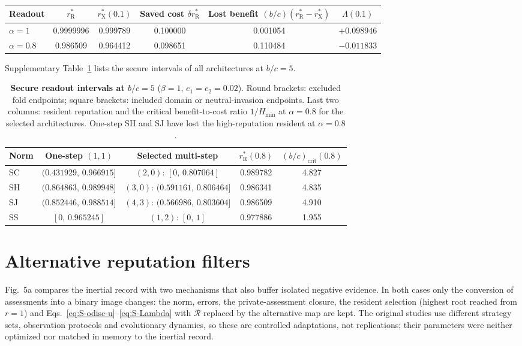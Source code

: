 \documentclass[fleqn,10pt]{article}
\theoremstyle{plain}
\theoremstyle{remark}
\newcommand{\FigOpportunism}{5}
\newcommand{\Rm}{\mathcal R}
\newcommand{\rR}{r^*_{\mathrm R}}
\begin{document}
\begin{center}\small
\begin{tabular}{@{}lccccc@{}}
\toprule
Readout & $\rR$ & $r^*_{\mathrm X}(0.1)$ & Saved cost $\delta\rR$ & Lost benefit $(b/c)(\rR-r^*_{\mathrm X})$ & $\Lambda(0.1)$\\
\midrule
$\alpha=1$ & 0.9999996 & 0.999789 & 0.100000 & 0.001054 & $+0.098946$\\
$\alpha=0.8$ & 0.986509 & 0.964412 & 0.098651 & 0.110484 & $-0.011833$\\
\bottomrule
\end{tabular}
\end{center}

Supplementary Table~\ref{tab:readout} lists the secure intervals of all
architectures at $b/c=5$.

\begin{table}[htbp]
\centering\small
\caption{\textbf{Secure readout intervals at $b/c=5$} ($\beta=1$, $e_1=e_2=0.02$). Round brackets: excluded fold endpoints; square brackets: included domain or neutral-invasion endpoints. Last two columns: resident reputation and the critical benefit-to-cost ratio $1/H_{\min}$ at $\alpha=0.8$ for the selected architectures. One-step SH and SJ have lost the high-reputation resident at $\alpha=0.8$.}
\label{tab:readout}
\begin{tabular}{@{}lcccc@{}}
\toprule
Norm & One-step $(1,1)$ & Selected multi-step & $\rR(0.8)$ & $(b/c)_{\mathrm{crit}}(0.8)$\\
\midrule
SC & $(0.431929,\,0.966915]$ & $(2,0)$: $[0,\,0.807064]$ & 0.989782 & 4.827\\
SH & $(0.864863,\,0.989948]$ & $(3,0)$: $(0.591161,\,0.806464]$ & 0.986341 & 4.835\\
SJ & $(0.852446,\,0.988514]$ & $(4,3)$: $(0.566986,\,0.803604]$ & 0.986509 & 4.910\\
SS & $[0,\,0.965245]$ & $(1,2)$: $[0,\,1]$ & 0.977886 & 1.955\\
\bottomrule
\end{tabular}
\end{table}

\section{Alternative reputation filters}
\label{sec:filters}

Fig.~\FigOpportunism a compares the inertial record with two mechanisms that
also buffer isolated negative evidence. In both cases only the conversion of
assessments into a binary image changes: the norm, errors, the
private-assessment closure, the resident selection (highest root reached from
$r=1$) and Eqs.~\eqref{eq:S-odisc-u}--\eqref{eq:S-Lambda} with $\Rm$ replaced by the
alternative map are kept. The original studies use different strategy sets,
observation protocols and evolutionary dynamics, so these are controlled
adaptations, not replications; their parameters were neither optimized nor
matched in memory to the inertial record.
\end{document}
